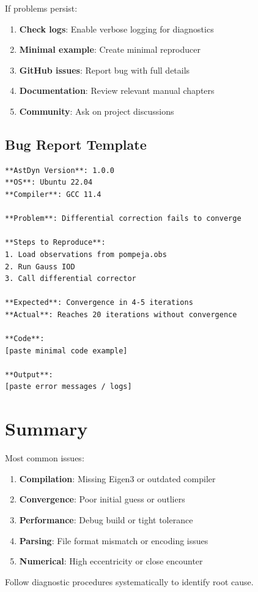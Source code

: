 If problems persist:

\begin{enumerate}
    \item \textbf{Check logs}: Enable verbose logging for diagnostics
    \item \textbf{Minimal example}: Create minimal reproducer
    \item \textbf{GitHub issues}: Report bug with full details
    \item \textbf{Documentation}: Review relevant manual chapters
    \item \textbf{Community}: Ask on project discussions
\end{enumerate}

\subsection{Bug Report Template}

\begin{lstlisting}
**AstDyn Version**: 1.0.0
**OS**: Ubuntu 22.04
**Compiler**: GCC 11.4

**Problem**: Differential correction fails to converge

**Steps to Reproduce**:
1. Load observations from pompeja.obs
2. Run Gauss IOD
3. Call differential corrector

**Expected**: Convergence in 4-5 iterations
**Actual**: Reaches 20 iterations without convergence

**Code**:
[paste minimal code example]

**Output**:
[paste error messages / logs]
\end{lstlisting}

\section{Summary}

Most common issues:

\begin{enumerate}
    \item \textbf{Compilation}: Missing Eigen3 or outdated compiler
    \item \textbf{Convergence}: Poor initial guess or outliers
    \item \textbf{Performance}: Debug build or tight tolerance
    \item \textbf{Parsing}: File format mismatch or encoding issues
    \item \textbf{Numerical}: High eccentricity or close encounter
\end{enumerate}

Follow diagnostic procedures systematically to identify root cause.
